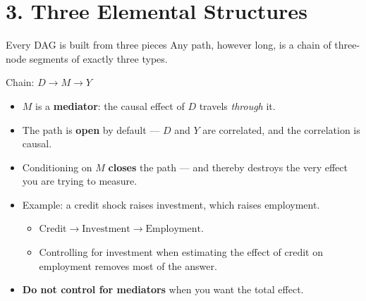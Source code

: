 \documentclass[
  11pt,
  ignorenonframetext,
  aspectratio=169,
]{beamer}
\providecommand{\tightlist}{%
  \setlength{\itemsep}{0pt}\setlength{\parskip}{0pt}}
\begin{document}
\section{3. Three Elemental
Structures}\label{three-elemental-structures}

\begin{frame}{Every DAG is built from three pieces}
\protect{}\label{every-dag-is-built-from-three-pieces}
Any path, however long, is a chain of three-node segments of exactly
three types.

\begin{center}
\end{center}
\end{frame}

\begin{frame}{Chain: \(D \to M \to Y\)}
\protect{}\label{chain-d-to-m-to-y}
\begin{itemize}
\tightlist
\item
  \(M\) is a \textbf{mediator}: the causal effect of \(D\) travels
  \emph{through} it.
\item
  The path is \textbf{open} by default --- \(D\) and \(Y\) are
  correlated, and the correlation is causal.
\item
  Conditioning on \(M\) \textbf{closes} the path --- and thereby
  destroys the very effect you are trying to measure.
\item
  Example: a credit shock raises investment, which raises employment.

  \begin{itemize}
  \tightlist
  \item
    \(\text{Credit} \to \text{Investment} \to \text{Employment}\).
  \item
    Controlling for investment when estimating the effect of credit on
    employment removes most of the answer.
  \end{itemize}
\item
  \textbf{Do not control for mediators} when you want the total effect.
\end{itemize}
\end{frame}
\end{document}
